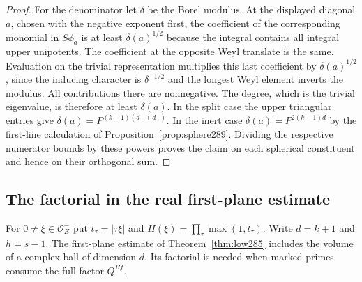 \documentclass[a4paper,11pt]{article}
\theoremstyle{definition}
\theoremstyle{remark}
\numberwithin{equation}{section}
\begin{document}
\begin{proof}
For the denominator let \(\delta\) be the Borel modulus.
At the displayed diagonal \(a\), chosen with the negative
exponent first, the coefficient of the corresponding
monomial in \(S\phi_a\) is at least \(\delta(a)^{1/2}\)
because the integral contains all integral upper unipotents.
The coefficient at the opposite Weyl translate is the
same. Evaluation on the trivial representation multiplies
this last coefficient by \(\delta(a)^{1/2}\), since the
inducing character is \(\delta^{-1/2}\) and the longest
Weyl element inverts the modulus. All contributions there
are nonnegative. The degree, which is the trivial
eigenvalue, is therefore at least \(\delta(a)\).
In the split case the upper triangular entries give
\(\delta(a)=P^{(k-1)(d_-+d_+)}\). In the inert case
\(\delta(a)=P^{2(k-1)d}\) by the first-line calculation of
Proposition~\ref{prop:sphere289}. Dividing the respective
numerator bounds by these powers proves the claim on each
spherical constituent and hence on their orthogonal sum.
\end{proof}

\subsection{The factorial in the real first-plane estimate}\label{nav:III-56}
For \(0\ne\xi\in\mathcal O_E^-\) put
\(t_\tau=|\tau\xi|\) and \(H(\xi)=\prod_\tau\max(1,t_\tau)\).
Write \(d=k+1\) and \(h=s-1\). The first-plane estimate of
Theorem~\ref{thm:low285} includes the volume of a complex
ball of dimension \(d\). Its factorial is needed when
marked primes consume the full factor \(Q^{Rf}\).
\end{document}
